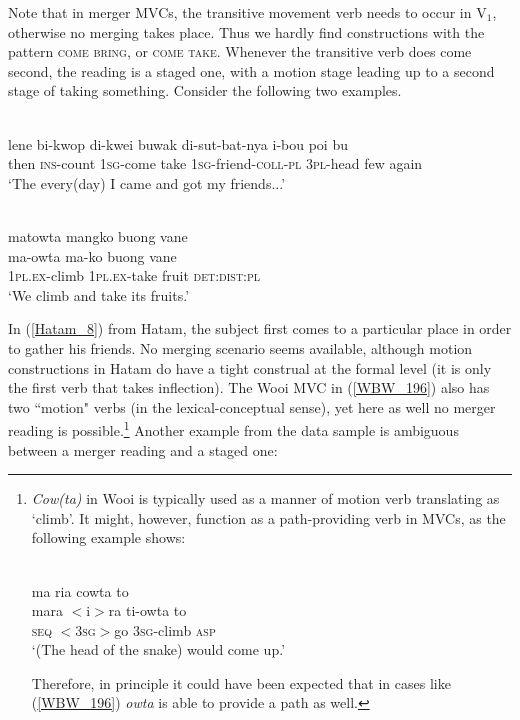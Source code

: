 Note that in merger MVCs, the transitive movement verb needs to occur in V$_1$, otherwise no merging takes place. Thus we hardly find constructions with the pattern \textsc{come} \textsc{bring}, or \textsc{come} \textsc{take}. Whenever the transitive verb does come second, the reading is a staged one, with a motion stage leading up to a second stage of taking something. Consider the following two examples.

\ea \label{Hatam_8}
\\
\gll lene bi-kwop di-kwei buwak di-sut-bat-nya i-bou poi bu \\
then \textsc{ins}-count 1\textsc{sg}-come take 1\textsc{sg}-friend-\textsc{coll}-\textsc{pl} 3\textsc{pl}-head few again \\
\glft `The every(day) I came and got my friends...' \\ 
\z

\ea \label{WBW_196} 
\\
\glll matowta mangko buong vane \\
ma-owta ma-ko buong vane \\
1\textsc{pl}.\textsc{ex}-climb 1\textsc{pl}.\textsc{ex}-take fruit \textsc{det}:\textsc{dist}:\textsc{pl}\\
\glft `We climb and take its fruits.' \\ 
\z

In (\ref{Hatam_8}) from Hatam, the subject first comes to a particular place in order to gather his friends. No merging scenario seems available, although motion constructions in Hatam do have a tight construal at the formal level (it is only the first verb that takes inflection). The Wooi MVC in (\ref{WBW_196}) also has two ``motion" verbs (in the lexical-conceptual sense), yet here as well no merger reading is possible.\footnote{\textit{Cow(ta)} in Wooi is typically used as a manner of motion verb translating as `climb'. It might, however, function as a path-providing verb in MVCs, as the following example shows:

\ea 
{}\\
\glll ma ria cowta to \\
mara $<$i$>$ra ti-owta to \\
\textsc{seq} $<$3\textsc{sg}$>$go 3\textsc{sg}-climb \textsc{asp}\\
\glft `(The head of the snake) would come up.'\\ 
\z

Therefore, in principle it could have been expected that in cases like (\ref{WBW_196}) \textit{owta} is able to provide a path as well.} Another example from the data sample is ambiguous between a merger reading and a staged one:
 
